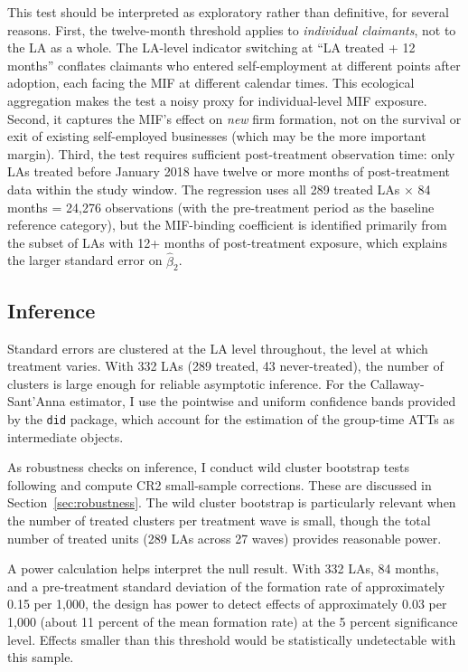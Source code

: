 \documentclass[12pt]{article}
\begin{document}
This test should be interpreted as exploratory rather than definitive, for several reasons. First, the twelve-month threshold applies to \textit{individual claimants}, not to the LA as a whole. The LA-level indicator switching at ``LA treated + 12 months'' conflates claimants who entered self-employment at different points after adoption, each facing the MIF at different calendar times. This ecological aggregation makes the test a noisy proxy for individual-level MIF exposure. Second, it captures the MIF's effect on \textit{new} firm formation, not on the survival or exit of existing self-employed businesses (which may be the more important margin). Third, the test requires sufficient post-treatment observation time: only LAs treated before January 2018 have twelve or more months of post-treatment data within the study window. The regression uses all 289 treated LAs $\times$ 84 months = 24,276 observations (with the pre-treatment period as the baseline reference category), but the MIF-binding coefficient is identified primarily from the subset of LAs with 12+ months of post-treatment exposure, which explains the larger standard error on $\hat{\beta}_2$.

\subsection{Inference}

Standard errors are clustered at the LA level throughout, the level at which treatment varies. With 332 LAs (289 treated, 43 never-treated), the number of clusters is large enough for reliable asymptotic inference. For the Callaway-Sant'Anna estimator, I use the pointwise and uniform confidence bands provided by the \texttt{did} package, which account for the estimation of the group-time ATTs as intermediate objects.

As robustness checks on inference, I conduct wild cluster bootstrap tests following \citet{cameron2008bootstrap} and compute CR2 small-sample corrections. These are discussed in Section~\ref{sec:robustness}. The wild cluster bootstrap is particularly relevant when the number of treated clusters per treatment wave is small, though the total number of treated units (289 LAs across 27 waves) provides reasonable power.

A power calculation helps interpret the null result. With 332 LAs, 84 months, and a pre-treatment standard deviation of the formation rate of approximately 0.15 per 1,000, the design has power to detect effects of approximately 0.03 per 1,000 (about 11 percent of the mean formation rate) at the 5 percent significance level. Effects smaller than this threshold would be statistically undetectable with this sample.
\end{document}
